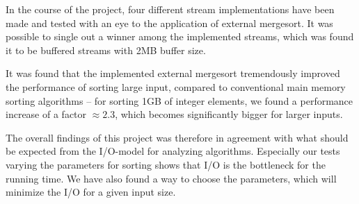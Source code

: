 In the course of the project, four different stream implementations
have been made and tested with an eye to the application of external
mergesort. It was possible to single out a winner among the
implemented streams, which was found it to be buffered streams with
2MB buffer size.

It was found that the implemented external mergesort tremendously
improved the performance of sorting large input, compared to
conventional main memory sorting algorithms -- for sorting 1GB of
integer elements, we found a performance increase of a factor $\approx
2.3$, which becomes significantly bigger for larger inputs.

The overall findings of this project was therefore in agreement with
what should be expected from the I/O-model for analyzing
algorithms. Especially our tests varying the parameters for sorting
shows that I/O is the bottleneck for the running time. We have also
found a way to choose the parameters, which will minimize the I/O for
a given input size.
